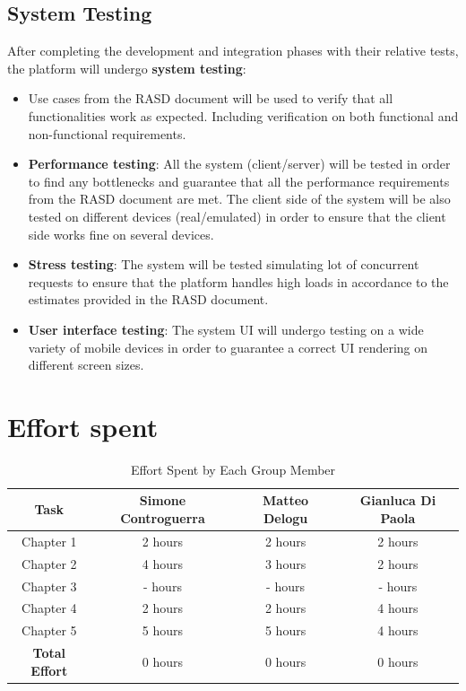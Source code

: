 \documentclass{Configuration_Files/PoliMi3i_thesis}
\begin{document}
\section{System Testing}
After completing the development and integration phases with their relative tests, the platform will undergo \textbf{system testing}:
\begin{itemize}
    \item Use cases from the RASD document will be used to verify that all functionalities work as expected. Including verification on both functional and non-functional requirements.
    
    \item \textbf{Performance testing}: All the system (client/server) will be tested in order to find any bottlenecks and guarantee that all the performance requirements from the RASD document are met.
    The client side of the system will be also tested on different devices (real/emulated) in order to ensure that the client side works fine on several devices.
    
    \item \textbf{Stress testing}: The system will be tested simulating lot of concurrent requests to ensure that the platform handles high loads in accordance to the estimates provided in the RASD document.
    
    \item \textbf{User interface testing}: The system UI will undergo testing on a wide variety of mobile devices in order to guarantee a correct UI rendering on different screen sizes.

\end{itemize}
\chapter{Effort spent}
\begin{table}[h!]
\centering
\begin{tabular}{|c|c|c|c|}
\hline
\textbf{Task} & \textbf{Simone Controguerra} & \textbf{Matteo Delogu} & \textbf{Gianluca Di Paola} \\

\hline
Chapter 1 & 2 hours & 2 hours & 2 hours \\
\hline
Chapter 2 & 4 hours & 3 hours & 2 hours\\
\hline
Chapter 3 & - hours & - hours & - hours\\
\hline
Chapter 4 & 2 hours & 2 hours & 4 hours \\
\hline
Chapter 5 & 5 hours & 5 hours & 4 hours \\
\hline
\textbf{Total Effort} & 0 hours & 0 hours & 0 hours\\
\hline
\end{tabular}
\caption{Effort Spent by Each Group Member}
\label{tab:effort_spent}
\end{table}
\end{document}
